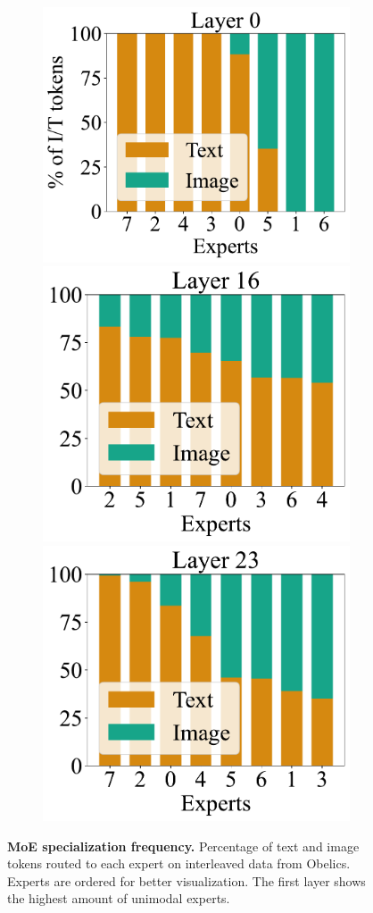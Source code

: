 

\begin{figure}[t!]
    \centering
    \captionsetup{type=figure}
    \begin{subfigure}[h]{0.95\linewidth}
    \includegraphics[height=0.27\textwidth]{assets/moes/specialization/sorted/tokens_assignment_obelics_1088_150_0.pdf}
    \includegraphics[height=0.27\textwidth]{assets/moes/specialization/sorted/tokens_assignment_obelics_1088_150_16.pdf}
    \includegraphics[height=0.27\textwidth]{assets/moes/specialization/sorted/tokens_assignment_obelics_1088_150_23.pdf}
    \end{subfigure}    \caption{\textbf{MoE specialization frequency.}
    Percentage of text and image tokens routed to each expert on interleaved
    data from Obelics. Experts are ordered for better visualization. The first
    layer shows the highest amount of unimodal experts.}
    \label{fig:tokens_assignment}
\end{figure}
